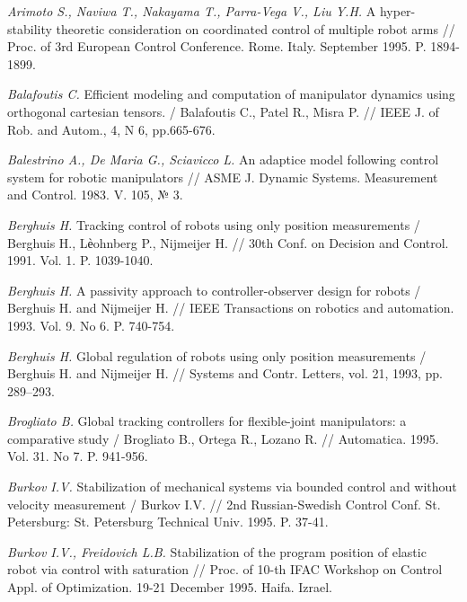 \begin{thebibliography}{10}
	{\it Arimoto S., Naviwa T., Nakayama T., Parra-Vega V., Liu Y.H.} A hyper-stability theoretic consideration on coordinated control of multiple robot arms // Proc. of 3rd European Control Conference. Rome. Italy. September 1995. P. 1894-1899. 
	
	{\it Balafoutis C.} Efficient modeling and computation of manipulator dynamics using orthogonal cartesian tensors. / Balafoutis C., Patel R., 		Misra P. // IEEE J. of Rob. and Autom., 4, N 6, pp.665-676.
	
	{\it Balestrino A., De Maria G., Sciavicco L.} An adaptice model following control system for robotic manipulators // ASME J. Dynamic Systems. Measurement and Control. 1983. V. 105, № 3.
	
	{\it Berghuis H.} Tracking control of robots using only position measurements / Berghuis H., Lѐohnberg P., Nijmeijer H. // 30th Conf. on 		Decision and Control. 1991. Vol. 1. P. 1039-1040.
	
	{\it Berghuis H.} A passivity approach to controller-observer design for robots / Berghuis H. and Nijmeijer H. // IEEE Transactions on robotics 	and automation. 1993. Vol. 9. No 6. P. 740-754.

	{\it Berghuis H.} Global regulation of robots using only position measurements / Berghuis H. and Nijmeijer H. // Systems and Contr. Letters, 		vol. 21, 1993, pp. 289–293. 
	
	{\it Brogliato B.} Global tracking controllers for flexible-joint manipulators: a comparative study / Brogliato B., Ortega R., Lozano R. // 		Automatica. 1995. Vol. 31. No 7. P. 941-956.
	
	{\it Burkov I.V.} Stabilization of mechanical systems via bounded control and without velocity measurement / Burkov I.V. // 2nd Russian-Swedish 	Control Conf. St. Petersburg: St. Petersburg Technical Univ. 1995. P. 37-41.
	
	{\it Burkov I.V., Freidovich L.B.} Stabilization of the program position of elastic robot via control with saturation // Proc. of 10-th IFAC Workshop on Control Appl. of Optimization. 19-21 December 1995. Haifa. Izrael.
	

\end{thebibliography}
